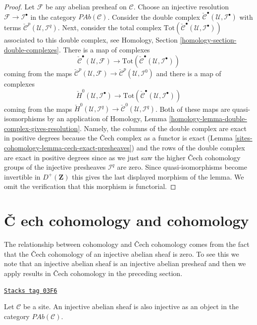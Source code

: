 \begin{proof}
\medskip\noindent
Let $\mathcal{F}$ be any abelian presheaf on $\mathcal{C}$.
Choose an injective resolution $\mathcal{F} \to \mathcal{I}^\bullet$
in the category $\textit{PAb}(\mathcal{C})$.
Consider the double complex
$\check{\mathcal{C}}^\bullet(\mathcal{U}, \mathcal{I}^\bullet)$
with terms $\check{\mathcal{C}}^p(\mathcal{U}, \mathcal{I}^q)$.
Next, consider the total complex
$\text{Tot}(\check{\mathcal{C}}^\bullet(\mathcal{U}, \mathcal{I}^\bullet))$
associated to this double complex, see
Homology, Section \ref{homology-section-double-complexes}.
There is a map of complexes
$$
\check{\mathcal{C}}^\bullet(\mathcal{U}, \mathcal{F})
\longrightarrow
\text{Tot}(\check{\mathcal{C}}^\bullet(\mathcal{U}, \mathcal{I}^\bullet))
$$
coming from the maps
$\check{\mathcal{C}}^p(\mathcal{U}, \mathcal{F})
\to \check{\mathcal{C}}^p(\mathcal{U}, \mathcal{I}^0)$
and there is a map of complexes
$$
\check{H}^0(\mathcal{U}, \mathcal{I}^\bullet)
\longrightarrow
\text{Tot}(\check{\mathcal{C}}^\bullet(\mathcal{U}, \mathcal{I}^\bullet))
$$
coming from the maps
$\check{H}^0(\mathcal{U}, \mathcal{I}^q) \to
\check{\mathcal{C}}^0(\mathcal{U}, \mathcal{I}^q)$.
Both of these maps are quasi-isomorphisms by an application of
Homology, Lemma \ref{homology-lemma-double-complex-gives-resolution}.
Namely, the columns of the double complex are exact in positive degrees
because the {\v C}ech complex as a functor is exact
(Lemma \ref{sites-cohomology-lemma-cech-exact-presheaves})
and the rows of the double complex are exact in positive degrees
since as we just saw the higher {\v C}ech cohomology groups of the injective
presheaves $\mathcal{I}^q$ are zero.
Since quasi-isomorphisms become invertible
in $D^{+}(\mathbf{Z})$ this gives the last displayed morphism
of the lemma. We omit the verification that this morphism is
functorial.
\end{proof}

\section{{\v C}
ech cohomology and cohomology}
\label{sites-cohomology-section-cech-cohomology-cohomology}

The relationship between cohomology and {\v C}ech cohomology comes from the fact
that the {\v C}ech cohomology of an injective abelian sheaf is zero. To see this
we note that an injective abelian sheaf is an injective abelian presheaf and
then we apply results in {\v C}ech cohomology in the preceding section.

\begin{lemma}
\label{sites-cohomology-lemma-injective-abelian-sheaf-injective-presheaf}
\href{https://stacks.math.columbia.edu/tag/03F6}{\texttt{Stacks tag 03F6}}

Let $\mathcal{C}$ be a site. An injective abelian sheaf is also injective as an
object in the category $\textit{PAb}(\mathcal{C})$.
\end{lemma}

